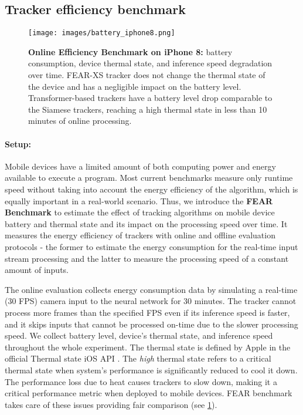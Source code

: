 \documentclass[runningheads]{llncs}
\begin{document}
\subsection{Tracker efficiency benchmark} 

\begin{figure}[t!]\centering
\texttt{[image: images/battery\_iphone8.png]}
\caption{\textbf{Online Efficiency Benchmark on iPhone 8:} battery consumption, device thermal state, and inference speed degradation over time. FEAR-XS tracker does not change the thermal state of the device and has a negligible impact on the battery level. Transformer-based trackers have a battery level drop comparable to the Siamese trackers, reaching a high thermal state in less than 10 minutes of online processing.}
\label{fig:battery-online}
\end{figure}

\paragraph{Setup:} Mobile devices have a limited amount of both computing power and energy available to execute a program. Most current benchmarks measure only runtime speed without taking into account the energy efficiency of the algorithm, which is equally important in a real-world scenario. Thus, we introduce the \textbf{FEAR Benchmark} to estimate the effect of tracking algorithms on mobile device battery and thermal state and its impact on the processing speed over time. It measures the energy efficiency of trackers with online and offline evaluation protocols - the former to estimate the energy consumption for the real-time input stream processing and the latter to measure the processing speed of a constant amount of inputs.

The online evaluation collects energy consumption data by simulating a real-time (30 FPS) camera input to the neural network for 30 minutes.
The tracker cannot process more frames than the specified FPS even if its inference speed is faster, and it skips inputs that cannot be processed on-time due to the slower processing speed. 
We collect battery level, device's thermal state, and inference speed throughout the whole experiment. 
The thermal state is defined by Apple in the official Thermal state iOS API \cite{thermalstate}. 
The \textit{high} thermal state refers to a critical thermal state when system's performance is significantly reduced to cool it down.
The performance loss due to heat causes trackers to slow down, making it a critical performance metric when deployed to mobile devices.
FEAR benchmark takes care of these issues providing fair comparison (see \cref{fig:battery-online}).
\end{document}
